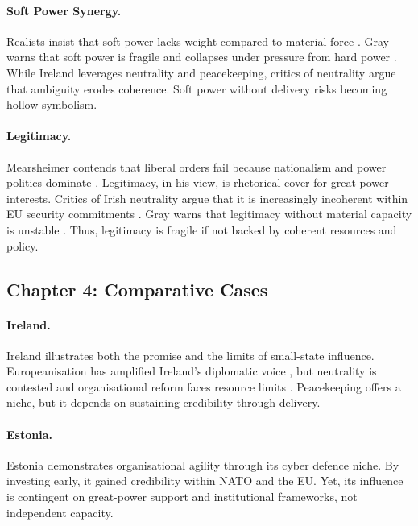 \paragraph{Soft Power Synergy.}  
Realists insist that soft power lacks weight compared to material force \parencite{WALTZ_1979, MEARSHEIMER_2019}. Gray warns that soft power is fragile and collapses under pressure from hard power \parencite{GRAY_2005}. While Ireland leverages neutrality and peacekeeping, critics of neutrality argue that ambiguity erodes coherence. Soft power without delivery risks becoming hollow symbolism.

\paragraph{Legitimacy.}  
Mearsheimer contends that liberal orders fail because nationalism and power politics dominate \parencite{MEARSHEIMER_2019}. Legitimacy, in his view, is rhetorical cover for great-power interests. Critics of Irish neutrality argue that it is increasingly incoherent within EU security commitments \parencite{WHITE_2015}. Gray warns that legitimacy without material capacity is unstable \parencite{GRAY_2018}. Thus, legitimacy is fragile if not backed by coherent resources and policy.

\subsection*{Chapter 4: Comparative Cases}
\paragraph{Ireland.}  
Ireland illustrates both the promise and the limits of small-state influence. Europeanisation has amplified Ireland’s diplomatic voice \parencite{TONRA_1999}, but neutrality is contested and organisational reform faces resource limits \parencite{HLAP_2022, DOD_2025}. Peacekeeping offers a niche, but it depends on sustaining credibility through delivery.

\paragraph{Estonia.}  
Estonia demonstrates organisational agility through its cyber defence niche. By investing early, it gained credibility within NATO and the EU. Yet, its influence is contingent on great-power support and institutional frameworks, not independent capacity.

